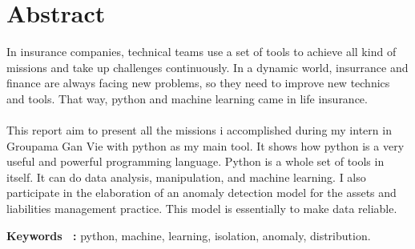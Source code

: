\chapter*{Abstract}

In insurance companies, technical teams use a set of tools to achieve all kind of missions and take up challenges continuously. In a dynamic world, insurrance and finance are always facing new problems, so they need to improve new technics and tools. That way, python and machine learning came in life insurance. 
\\
\\
This report aim to present all the missions i accomplished during my intern in Groupama Gan Vie with python as my main tool. It shows how python is a very useful and powerful programming language. Python is a whole set of tools in itself. It can do data analysis, manipulation, and machine learning. I also participate in the elaboration of an anomaly detection model for the assets and liabilities management practice. This model is essentially to make data reliable.

\begin{singlespace}
\textbf {Keywords ~:} python, machine, learning, isolation, anomaly, distribution.
\end{singlespace}

